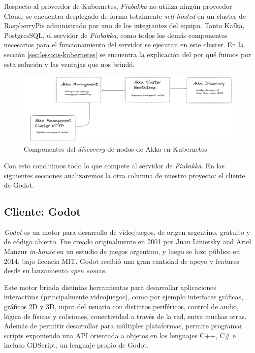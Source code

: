 Respecto al proveedor de Kubernetes, \textit{Fiubakka} no utiliza ningún proveedor Cloud; se encuentra desplegado de forma totalmente \textit{self hosted} en un cluster de RaspberryPis administrado
por uno de los integrantes del equipo. Tanto Kafka, PostgresSQL, el servidor de \textit{Fiubakka}, como todos los demás componentes necesarios para el funcionamiento del servidor se ejecutan en este cluster.
En la sección \ref{sec:lessons-kubernetes} se encuentra la explicación del por qué fuimos por esta solución y las ventajas que nos brindó.

\begin{figure}[htbp]
    \centering
    \includegraphics[width=1\textwidth]{../assets/akka-management.png}
    \caption{Componentes del \textit{discovery} de nodos de Akka en Kubernetes}
\end{figure}

Con esto concluimos todo lo que compete al servidor de \textit{Fiubakka}. En las siguientes secciones analizaremos la otra columna de nuestro proyecto: el cliente de Godot.

\subsection{Cliente: Godot}

\noindent \textit{Godot} es un motor para desarrollo de videojuegos, de origen argentino, gratuito y de código abierto. 
Fue creado originalmente en 2001 por Juan Linietsky and Ariel Manzur \textit{in-house} en un estudio de juegos argentino,
y luego se hizo público en 2014, bajo licencia MIT. Godot recibió una gran cantidad de apoyo y features desde su 
lanzamiento \textit{open source}.

Este motor brinda distintas herramientas para desarrollar aplicaciones interactivas (principalmente
videojuegos), como por ejemplo interfaces gráficas, gráficos 2D y 3D, input del usuario con distintos periféricos, 
control de audio, lógica de físicas y colisiones, conectividad a través de la red, entre muchas otras.
Además de permitir desarrollar para múltiples plataformas, permite programar scripts exponiendo una 
API orientada a objetos en los lenguajes C++, C\# e incluso GDScript, un lenguaje propio de Godot. 

